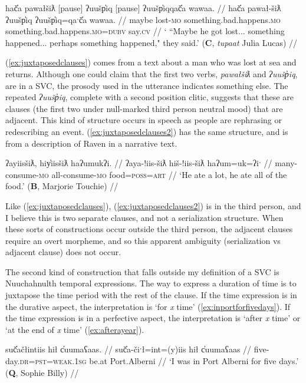 \ex \label{ex:juxtaposedclauses}
\begingl
\glpreamble hač̓a pawałšiƛ [pause] ʔuušp̓iq [pause] ʔuušp̓iqqač̓a wawaa. //
\gla hač̓a pawał-šiƛ ʔuušp̓iq ʔuušp̓iq=qaˑč̓a wawaa. //
\glb maybe lost-\textsc{mo} something.bad.happens.\textsc{mo} something.bad.happens.\textsc{mo}=\textsc{dubv} say.\textsc{cv} //
\glft ` ``Maybe he got lost... something happened... perhaps something happened," they said.' (\textbf{C}, \textit{tupaat} Julia Lucas) //
\endgl
\xe

(\ref{ex:juxtaposedclauses}) comes from a text about a man who was lost at sea and returns. Although one could claim that the first two verbs, \textit{pawałšiƛ} and \textit{ʔuušp̓iq}, are in a SVC, the prosody used in the utterance indicates something else. The repeated \textit{ʔuušp̓iq}, complete with a second position clitic, suggests that these are clauses (the first two under null-marked third person neutral mood) that are adjacent. This kind of structure occurs in speech as people are rephrasing or redescribing an event. (\ref{ex:juxtaposedclauses2}) has the same structure, and is from a description of Raven in a narrative text.

\ex \label{ex:juxtaposedclauses2}
\begingl
\glpreamble ʔayiisšiƛ, hiy̓iisšiƛ haʔumukʔi. //
\gla ʔaya-!iis-šiƛ hiš-!iis-šiƛ haʔum=uk=ʔiˑ //
\glb many-consume-\textsc{mo} all-consume-\textsc{mo} food=\textsc{poss}=\textsc{art} //
\glft `He ate a lot, he ate all of the food.' (\textbf{B}, Marjorie Touchie) //
\endgl
\xe

Like (\ref{ex:juxtaposedclauses}), (\ref{ex:juxtaposedclauses2}) is in the third person, and I believe this is two separate clauses, and not a serialization structure. When these sorts of constructions occur outside the third person, the adjacent clauses require an overt morpheme, and so this apparent ambiguity (serialization vs adjacent clause) does not occur.

The second kind of construction that falls outside my definition of a SVC is Nuuchahnulth temporal expressions. The way to express a duration of time is to juxtapose the time period with the rest of the clause. If the time expression is in the durative aspect, the interpretation is `for \textit{x} time' (\ref{ex:inportforfivedays}). If the time expression is in a perfective aspect, the interpretation is `after \textit{x} time' or `at the end of \textit{x} time' (\ref{ex:afterayear}).

\ex \label{ex:inportforfivedays}
\begingl
\glpreamble suč̓ačłintiis hił c̓uumaʕaas. //
\gla suč̓a-čiˑł=int=(y)iis hił c̓uumaʕaas //
\glb five-day.\textsc{dr}=\textsc{pst}=\textsc{weak.1sg} be.at Port.Alberni //
\glft `I was in Port Alberni for five days.' (\textbf{Q}, Sophie Billy) //
\endgl
\xe

